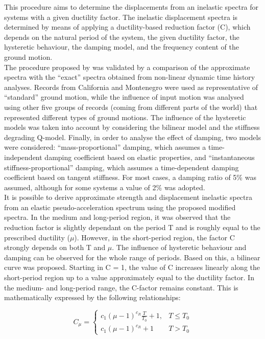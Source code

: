 This procedure aims to determine the displacements from an inelastic spectra for systems with a given ductility factor. The inelastic displacement spectra is determined by means of applying a ductility-based reduction factor (C), which depends on the natural period of the system, the given ductility factor, the hysteretic behaviour, the damping model, and the frequency content of the ground motion.\\
The procedure proposed by \citep{VidicEtAl1994} was validated by a comparison of the approximate spectra with the “exact” spectra obtained from non-linear dynamic time history analyses. Records from California and Montenegro were used as representative of “standard” ground motion, while the influence of input motion was analysed using other five groups of records (coming from different parts of the world) that represented different types of ground motions. The influence of the hysteretic models was taken into account by considering the bilinear model and the stiffness degrading Q-model. Finally, in order to analyse the effect of damping, two models were considered: “mass-proportional” damping, which assumes a time-independent damping coefficient based on elastic properties, and “instantaneous stiffness-proportional” damping, which assumes a time-dependent damping coefficient based on tangent stiffness. For most cases, a damping ratio of 5\% was assumed, although for some systems a value of 2\% was adopted.\\

It is possible to derive approximate strength and displacement inelastic spectra from an elastic pseudo-acceleration spectrum using the proposed modified spectra. In the medium and long-period region, it was observed that the reduction factor is slightly dependant on the period T and is roughly equal to the prescribed ductility ($\mu$). However, in the short-period region, the factor C strongly depends on both T and $\mu$. The influence of hysteretic behaviour and damping can be observed for the whole range of periods. Based on this, a bilinear curve was proposed. Starting in C = 1, the value of C increases linearly along the short-period region up to a value approximately equal to the ductility factor. In the medium- and long-period range, the C-factor remains constant. This is mathematically expressed by the following relationships:


\begin{equation}
C_\mu = \left\{
\begin{matrix}
  c_{1}\left(\mu-1\right)^{c_{R}}\frac{T}{T_{0}} + 1, & T\leq T_{0}  \\
  c_{1}\left(\mu-1\right)^{c_{R}} + 1 & T>T_{0}
 \end{matrix}
 \right.
\end{equation} 

